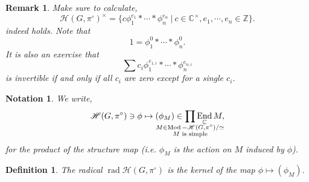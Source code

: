 \documentclass[8pt]{article}
\newtheorem{definition}{Definition}[section]
\newtheorem{notation}{Notation}[section]
\newtheorem{remark}{Remark}[section]
\DeclareMathOperator{\rad}{rad}
\DeclareMathOperator{\End}{End}
\DeclareMathOperator{\Mod}{Mod}
\newcommand{\Z}[0]{\mathbb{Z}}
\newcommand{\C}[0]{\mathbb{C}}
\newcommand{\sep}[0]{\:|\:}
\newcommand{\hecke}[0]{\mathscr{H}}
\begin{document}
\begin{remark}
  Make sure to calculate, 
  \begin{equation*}
  \hecke(G,\pi^\circ)^\times  = \{c\phi_1^{e_1}\ast\cdots\ast\phi_n^{e_n}\sep c\in\C^\times,e_1,\cdots,e_n\in\Z\}. 
  \end{equation*}
  indeed holds. Note that 
  \begin{equation*}
    1 = \phi_1^0\ast\cdots\ast\phi_n^0.
  \end{equation*}
  It is also an exercise that
  \begin{equation*}
    \sum c_i\phi_1^{e_{1,i}}\ast\cdots\ast\phi_n^{e_{n,i}}
  \end{equation*}
  is invertible if and only if all $c_i$ are zero except for a single $c_i$.
\end{remark}

\begin{notation}
  We write,
  \begin{equation*}
    \hecke(G,\pi^\circ)\ni\phi\mapsto(\phi_M)\in\prod_{\mathmakebox[0pt][c]{\substack{M\in\Mod-\hecke(G,\pi^\circ)/\simeq\\ \text{$M$ is simple}}}}\End_\C M,
  \end{equation*}
  for the product of the structure map (i.e. $\phi_M$ is the action on $M$ induced by $\phi$).
\end{notation}

\begin{definition}
  The radical $\rad\hecke(G,\pi^\circ)$ is the kernel of the map $\phi\mapsto(\phi_M)$. 
\end{definition}
\end{document}
